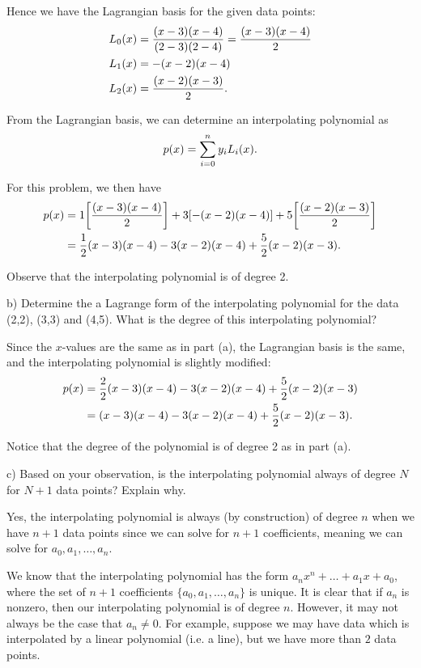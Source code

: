 \documentclass[12pt,a4paper]{article}
\begin{document}
Hence we have the Lagrangian basis for the given data points:
\begin{align*}
    L_0\qty(x) &= \frac{\qty(x-3)\qty(x-4)}{\qty(2-3)\qty(2-4)} = \frac{\qty(x-3)\qty(x-4)}{2} \\
    L_1\qty(x) &= -\qty(x-2)\qty(x-4) \\
    L_2\qty(x) &= \frac{\qty(x-2)\qty(x-3)}{2}
.\end{align*}

From the Lagrangian basis, we can determine an interpolating polynomial as
\begin{align*}
    p\qty(x) = \sum_{i=0}^{n} y_iL_i\qty(x) 
.\end{align*}

For this problem, we then have
\begin{align*}
    p\qty(x) &= 1\qty[\frac{\qty(x-3)\qty(x-4)}{2}] + 3\qty[-\qty(x-2)\qty(x-4)] + 5\qty[\frac{\qty(x-2)\qty(x-3)}{2}]  \\
    &= \frac{1}{2}\qty(x-3)\qty(x-4) - 3\qty(x-2)\qty(x-4)  + \frac{5}{2}\qty(x-2)\qty(x-3) 
.\end{align*}

Observe that the interpolating polynomial is of degree 2.

b) Determine the a Lagrange form of the interpolating polynomial for the data (2,2), (3,3) and (4,5).
What is the degree of this interpolating polynomial?

Since the $x$-values are the same as in part (a), the Lagrangian basis is the same, and the interpolating polynomial is slightly modified:
\begin{align*}
    p\qty(x) &= \frac{2}{2}\qty(x-3)\qty(x-4) - 3\qty(x-2)\qty(x-4)  + \frac{5}{2}\qty(x-2)\qty(x-3) \\
    &= \qty(x-3)\qty(x-4) - 3\qty(x-2)\qty(x-4)  + \frac{5}{2}\qty(x-2)\qty(x-3) 
.\end{align*}

Notice that the degree of the polynomial is of degree 2 as in part (a).

c) Based on your observation, is the interpolating polynomial always of degree $N$ for $N+1$ data points? 
Explain why.

Yes, the interpolating polynomial is always (by construction) of degree $n$ when we have $n+1$ data points since we can solve for $n+1$ coefficients, meaning we can solve for $a_0,a_1,\ldots,a_n$.

{\color{red} We know that the interpolating polynomial has the form $a_{n}x^{n} + \ldots + a_1 x + a_0$, where the set of $n+1$ coefficients $\{ a_0,a_1, \ldots, a_{n} \} $ is unique.
    It is clear that if $a_{n}$ is nonzero, then our interpolating polynomial is of degree $n$.
    However, it may not always be the case that $a_{n} \ne 0$.
    For example, suppose we may have data which is interpolated by a linear polynomial (i.e. a line), but we have more than $2$ data points.
}
\end{document}

